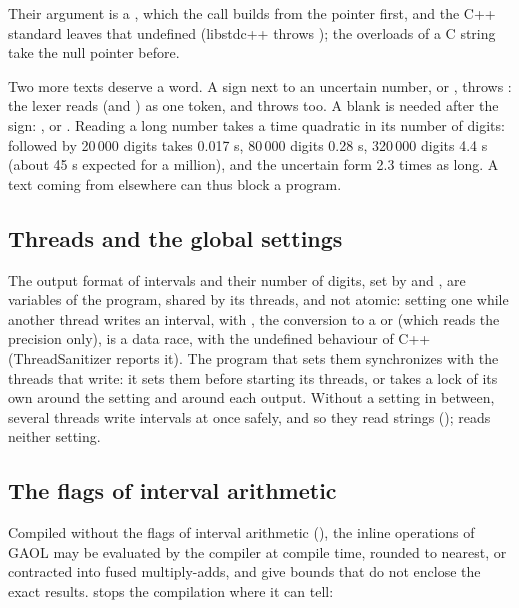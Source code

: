 \documentclass[12pt,a4paper,twoside,openright]{book}
\begin{document}
\noindent
Their argument is a , which the call builds from the
pointer first, and the C++ standard leaves that undefined (libstdc++ throws
); the overloads of a C string take the null pointer
before.\newinvfive

\medskip
Two more texts deserve a word. A sign next to an uncertain number,
 or , throws : the
lexer reads  (and ) as one token, and
 throws too. A blank is needed after the sign:
, or . Reading a long number takes a time
quadratic in its number of digits:  followed by 20\,000 digits
 takes 0.017 s, 80\,000 digits 0.28 s, 320\,000 digits 4.4 s (about
45 s expected for a million), and the uncertain form 2.3 times as long. A text
coming from elsewhere can thus block a program.

\subsection{Threads and the global settings}
%
%

The output format of intervals and their number of digits, set by
 and , are variables of
the program, shared by its threads, and not atomic: setting one while another
thread writes an interval, with , the conversion to a
 or  (which reads
the precision only), is a data race, with the undefined behaviour of C++
(ThreadSanitizer reports it). The program that sets them synchronizes with
the threads that write: it sets them before starting its threads, or takes a
lock of its own around the setting and around each output. Without a setting
in between, several threads write intervals at once safely, and so they read
strings ();  reads neither
setting.\newinvfive

\subsection{The flags of interval arithmetic}

Compiled without the flags of interval arithmetic (), the
inline operations of GAOL may be evaluated by the compiler at compile time,
rounded to nearest, or contracted into fused multiply-adds, and give bounds
that do not enclose the exact results.  stops the
compilation where it can tell:
\end{document}
